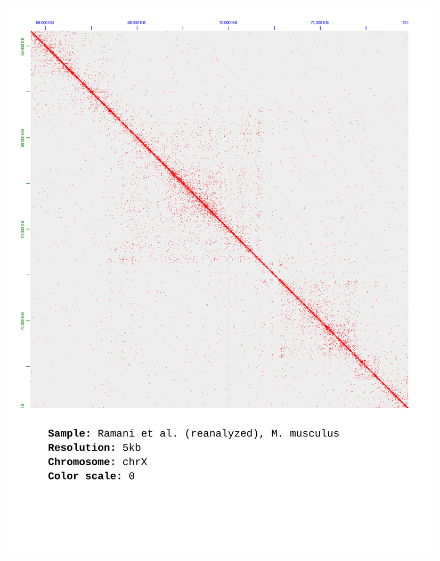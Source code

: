 \documentclass[a4paper,14pt]{extarticle}
\begin{document}
\begin{figure}[hp!] \includegraphics[width=1\textwidth]{ramani-brain_chrX_5kb_0.pdf} \end{figure}
\end{document}
